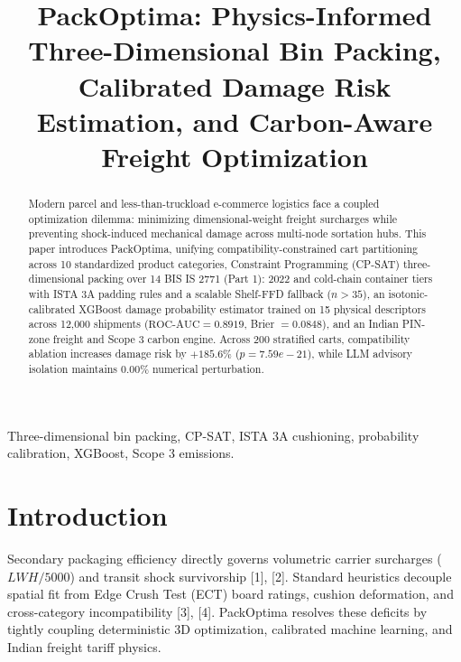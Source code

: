 \documentclass[conference]{IEEEtran}
\begin{document}
\title{PackOptima: Physics-Informed Three-Dimensional Bin Packing, Calibrated Damage Risk Estimation, and Carbon-Aware Freight Optimization}

\author{
}

\maketitle
\thispagestyle{empty}

\begin{abstract}
Modern parcel and less-than-truckload e-commerce logistics face a coupled optimization dilemma: minimizing dimensional-weight freight surcharges while preventing shock-induced mechanical damage across multi-node sortation hubs. This paper introduces PackOptima, unifying compatibility-constrained cart partitioning across 10 standardized product categories, Constraint Programming (CP-SAT) three-dimensional packing over 14 BIS IS 2771 (Part 1): 2022 and cold-chain container tiers with ISTA 3A padding rules and a scalable Shelf-FFD fallback ($n > 35$), an isotonic-calibrated XGBoost damage probability estimator trained on 15 physical descriptors across 12,000 shipments ($\text{ROC-AUC} = 0.8919$, Brier $= 0.0848$), and an Indian PIN-zone freight and Scope 3 carbon engine. Across 200 stratified carts, compatibility ablation increases damage risk by $+185.6\%$ ($p = 7.59e-21$), while LLM advisory isolation maintains $0.00\%$ numerical perturbation.
\end{abstract}

\begin{IEEEkeywords}
Three-dimensional bin packing, CP-SAT, ISTA 3A cushioning, probability calibration, XGBoost, Scope 3 emissions.
\end{IEEEkeywords}

\section{Introduction}
Secondary packaging efficiency directly governs volumetric carrier surcharges ($LWH/5000$) and transit shock survivorship [1], [2]. Standard heuristics decouple spatial fit from Edge Crush Test (ECT) board ratings, cushion deformation, and cross-category incompatibility [3], [4]. PackOptima resolves these deficits by tightly coupling deterministic 3D optimization, calibrated machine learning, and Indian freight tariff physics.
\end{document}
